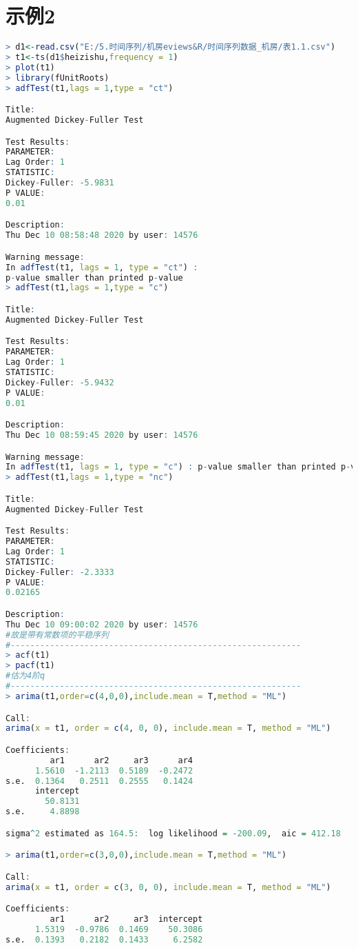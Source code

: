 \documentclass[11pt,a4paper,oneside]{book}
\begin{document}
\section{示例2}
\begin{lstlisting}[language=r]
> d1<-read.csv("E:/5.时间序列/机房eviews&R/时间序列数据_机房/表1.1.csv")
> t1<-ts(d1$heizishu,frequency = 1)
> plot(t1)
> library(fUnitRoots)
> adfTest(t1,lags = 1,type = "ct")

Title:
Augmented Dickey-Fuller Test

Test Results:
PARAMETER:
Lag Order: 1
STATISTIC:
Dickey-Fuller: -5.9831
P VALUE:
0.01 

Description:
Thu Dec 10 08:58:48 2020 by user: 14576

Warning message:
In adfTest(t1, lags = 1, type = "ct") :
p-value smaller than printed p-value
> adfTest(t1,lags = 1,type = "c")

Title:
Augmented Dickey-Fuller Test

Test Results:
PARAMETER:
Lag Order: 1
STATISTIC:
Dickey-Fuller: -5.9432
P VALUE:
0.01 

Description:
Thu Dec 10 08:59:45 2020 by user: 14576

Warning message:
In adfTest(t1, lags = 1, type = "c") : p-value smaller than printed p-value
> adfTest(t1,lags = 1,type = "nc")

Title:
Augmented Dickey-Fuller Test

Test Results:
PARAMETER:
Lag Order: 1
STATISTIC:
Dickey-Fuller: -2.3333
P VALUE:
0.02165 

Description:
Thu Dec 10 09:00:02 2020 by user: 14576
#故是带有常数项的平稳序列
#-----------------------------------------------------------
> acf(t1)
> pacf(t1)
#估为4阶q
#-----------------------------------------------------------
> arima(t1,order=c(4,0,0),include.mean = T,method = "ML")

Call:
arima(x = t1, order = c(4, 0, 0), include.mean = T, method = "ML")

Coefficients:
         ar1      ar2     ar3      ar4
      1.5610  -1.2113  0.5189  -0.2472
s.e.  0.1364   0.2511  0.2555   0.1424
      intercept
        50.8131
s.e.     4.8898

sigma^2 estimated as 164.5:  log likelihood = -200.09,  aic = 412.18

> arima(t1,order=c(3,0,0),include.mean = T,method = "ML")

Call:
arima(x = t1, order = c(3, 0, 0), include.mean = T, method = "ML")

Coefficients:
         ar1      ar2     ar3  intercept
      1.5319  -0.9786  0.1469    50.3086
s.e.  0.1393   0.2182  0.1433     6.2582


\end{lstlisting}
\end{document}
